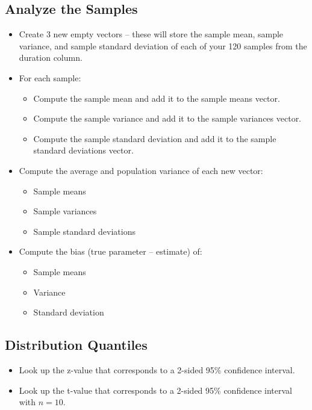 \documentclass{article}
\begin{document}
\subsection{Analyze the Samples}

\begin{itemize}
    \item Create 3 new empty vectors – these will store the sample mean, sample variance, and sample standard deviation of each of your 120 samples from the duration column.
    \item For each sample:
    \begin{itemize}
        \item Compute the sample mean and add it to the sample means vector.
        \item Compute the sample variance and add it to the sample variances vector.
        \item Compute the sample standard deviation and add it to the sample standard deviations vector.
    \end{itemize}
    \item Compute the average and population variance of each new vector:
    \begin{itemize}
        \item Sample means
        \item Sample variances
        \item Sample standard deviations
    \end{itemize}
    \item Compute the bias (true parameter – estimate) of:
    \begin{itemize}
        \item Sample means
        \item Variance
        \item Standard deviation
    \end{itemize}
\end{itemize}

\subsection{Distribution Quantiles}

\begin{itemize}
    \item Look up the z-value that corresponds to a 2-sided 95\% confidence interval.
    \item Look up the t-value that corresponds to a 2-sided 95\% confidence interval with \( n = 10 \).
\end{itemize}
\end{document}
